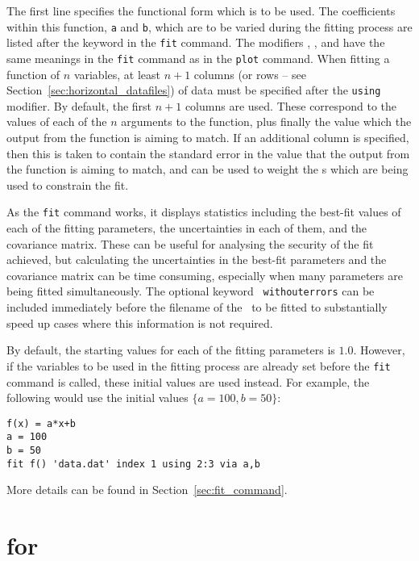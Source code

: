 \noindent The first line specifies the functional form which is to be used.
The coefficients within this function, {\tt a} and {\tt b}, which are to be
varied during the fitting process are listed after the keyword 
in the {\tt fit} command.  The modifiers , ,
 and  have the same meanings in the {\tt fit}
command as in the {\tt plot} command. When fitting a function of $n$
variables, at least $n+1$ columns (or rows -- see
Section~\ref{sec:horizontal_datafiles}) of data must be specified after the {\tt using}
modifier. By default, the first $n+1$ columns are used. These correspond to the
values of each of the $n$ arguments to the function, plus finally the value which
the output from the function is aiming to match.  If an additional column is
specified, then this is taken to contain the standard error in the value that
the output from the function is aiming to match, and can be used to weight the
\datapoint s which are being used to constrain the fit.

As the {\tt fit} command works, it displays statistics including the best-fit
values of each of the fitting parameters, the uncertainties in each of them,
and the covariance matrix. These can be useful for analysing the security of
the fit achieved, but calculating the uncertainties in the best-fit parameters
and the covariance matrix can be time consuming, especially when many
parameters are being fitted simultaneously. The optional keyword {\tt
withouterrors} can be included immediately before the filename of the
\datafile\ to be fitted to substantially speed up cases where this information
is not required.

By default, the starting values for each of the fitting parameters is
$1.0$. However, if the variables to be used in the fitting process are already
set before the {\tt fit} command is called, these initial values are used
instead. For example, the following would use the initial values
$\{a=100,b=50\}$:
\begin{verbatim}
f(x) = a*x+b
a = 100
b = 50
fit f() 'data.dat' index 1 using 2:3 via a,b
\end{verbatim}

More details can be found in Section~\ref{sec:fit_command}.


\section{for}

